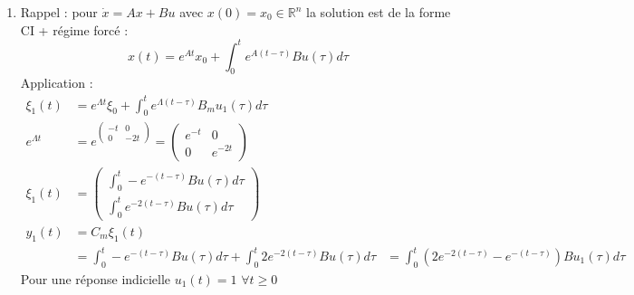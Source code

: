 \documentclass[../main.tex]{subfiles}
\begin{document}
\begin{enumerate}
\begin{enumerate}
\begin{align*}
\left \{ \begin{matrix}
\dot{x}_1 = A_1+x_1 +B_1 u_1\\
y_1 = C_1 x_1
\end{matrix} \right. \rightarrow \left \{ \begin{matrix}
\dot{\xi}_1 = \Lambda\xi_1 + V^{-1}B_1u_1\\
y_1 = C_1V\xi_1
\end{matrix} \right.\\
\intertext{avec,} \Lambda = V^{-1}A_1V = \begin{pmatrix}
-1&0\\0&-2
\end{pmatrix}
\intertext{On a alors :}
\left \{\begin{matrix}
V^{-1}B_1 = \begin{pmatrix}-1\\1 \end{pmatrix} = B_m\\
C_1V = \begin{matrix}1&2\end{matrix} = C_m
\end{matrix} \right.
\end{align*}
\bigbreak

\item Rappel : pour $\dot{x} = Ax +Bu$ avec $x(0)=x_0 \in \mathbb{R}^n$ la solution est de la forme CI + régime forcé :
\[ x(t) = e^{At}x_0 + \int_0^te^{A(t-\tau)}Bu(\tau)d\tau\]
\bigbreak
Application :
\begin{align*}
\xi_1(t) &= e^{\Lambda t}\xi_0 + \int_0^te^{\Lambda (t-\tau)}B_mu_1(\tau)d\tau\\
e^{\Lambda t} &= e^{\begin{pmatrix}-t&0\\0&-2t\end{pmatrix}} = \begin{pmatrix}
e^{-t}&0\\0&e^{-2t}\end{pmatrix}\\
\xi_1(t) &= \begin{pmatrix}
\int_0^t -e^{-(t-\tau)}Bu(\tau)d\tau\\
\int_0^t e^{-2(t-\tau)}Bu(\tau)d\tau
\end{pmatrix}\\
y_1(t) &= C_m\xi_1(t)\\
&= \int_0^t -e^{-(t-\tau)}Bu(\tau)d\tau + \int_0^t 2e^{-2(t-\tau)}Bu(\tau)d\tau
&= \int_0^t (2e^{-2(t-\tau)}-e^{-(t-\tau)})Bu_1(\tau)d\tau
\end{align*}
Pour une réponse indicielle $u_1(t) = 1$ $\forall t \geq 0$\\


\end{enumerate}
\end{enumerate}
\end{document}
